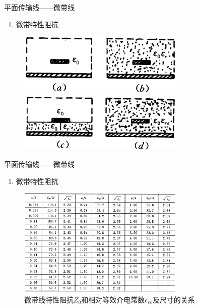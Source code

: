 \begin{frame}{平面传输线——微带线}
    \begin{enumerate}
        \resume
        \item 微带特性阻抗\\
    \end{enumerate}
    \begin{figure}
        \includegraphics[width=8cm]{Cha6//fig6-40.png}\\
        \includegraphics[width=8cm]{Cha6//fig6-41.png}
    \end{figure}
\end{frame}

\begin{frame}{平面传输线——微带线}
    \begin{enumerate}
        \resume
        \item 微带特性阻抗\\
    \end{enumerate}
    \begin{figure}
        \includegraphics[width=8cm]{Cha6//fig6-42.png}
        \caption{微带线特性阻抗$Z_0$和相对等效介电常数$\epsilon_{re}$及尺寸的关系}
    \end{figure}
\end{frame}

